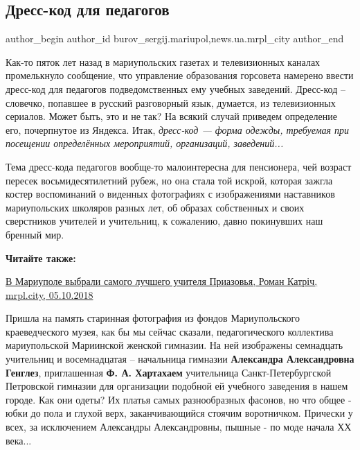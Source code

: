  
 
 
 
 
 
\subsection{Дресс-код для педагогов}
\label{sec:06_10_2018.stz.news.ua.mrpl_city.1.dress_kod_dlja_pedagogov}
 
\ifcmt
 author_begin
   author_id burov_sergij.mariupol,news.ua.mrpl_city
 author_end
\fi

Как-то пяток лет назад в мариупольских газетах и телевизионных каналах
промелькнуло сообщение, что управление образования горсовета намерено ввести
дресс-код для педагогов подведомственных ему учебных заведений. Дресс-код –
словечко, попавшее в русский разговорный язык, думается, из телевизионных
сериалов. Может быть, это и не так? На всякий случай  приведем определение его,
почерпнутое из Яндекса. Итак, \emph{дресс-код  — форма одежды, требуемая при
посещении определённых мероприятий, организаций, заведений...}

Тема дресс-кода педагогов вообще-то малоинтересна для пенсионера, чей возраст
пересек восьмидесятилетний рубеж, но она стала той искрой, которая зажгла
костер воспоминаний о виденных фотографиях с изображениями наставников
мариупольских школяров разных лет, об образах собственных и своих сверстников
учителей и учительниц, к сожалению, давно покинувших наш бренный мир.

\textbf{Читайте также:} 

\href{https://mrpl.city/news/view/v-mariupole-vybrali-samogo-luchshego-uchitelya-priazovya-foto-plusvideo}{%
В Мариуполе выбрали самого лучшего учителя Приазовья, Роман Катріч, mrpl.city, 05.10.2018}

Пришла на память старинная фотография из фондов Мариупольского краеведческого
музея, как бы мы сейчас сказали, педагогического коллектива мариупольской
Мариинской женской гимназии. На ней изображены семнадцать учительниц и
восемнадцатая – начальница гимназии \textbf{Александра Александровна Генглез},
приглашенная \textbf{Ф. А. Хартахаем} учительница Санкт-Петербургской Петровской гимназии
для организации подобной ей учебного заведения в нашем городе. Как они одеты?
Их платья самых разнообразных фасонов, но что общее - юбки до пола и глухой
верх, заканчивающийся стоячим воротничком. Прически у всех, за исключением
Александры Александровны, пышные - по моде начала ХХ века...

